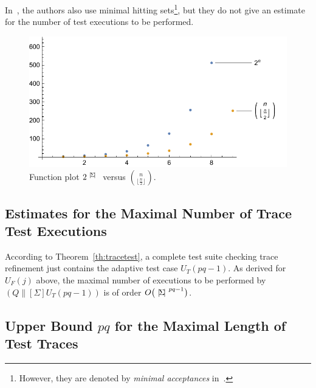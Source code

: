 In~\cite{DBLP:conf/icfem/CavalcantiG07}, the authors also use minimal hitting
sets\footnote{However, they are denoted by {\it minimal acceptances}
in~\cite{DBLP:conf/icfem/CavalcantiG07}.}, but they do not give an estimate for the number of test executions to be performed.


 \begin{figure}
 \begin{center}
\includegraphics[width=.8\textwidth]{curvecomparison.pdf}
\end{center}
\caption{Function plot $2^{{~|\! \Sigma\!|~}}$ versus $\binom{n}{\lfloor \frac{n}{2}\rfloor}$.}
 \label{fig:minhita}
 \end{figure}


\subsection{Estimates for the Maximal Number of Trace Test Executions}
\label{section:complexity:traces}

According to Theorem~\ref{th:tracetest}, a complete test suite checking trace
refinement just contains the adaptive test case $U_T(pq-1)$. As derived for
$U_F(j)$ above, the maximal number of executions to be performed by $(Q\parallel[\Sigma]
U_T(pq-1))$ is of order  $O\big({~|\! \Sigma\!|~}^{pq-1}\big)$.

\subsection{Upper Bound $pq$ for the Maximal Length of Test Traces}
\label{section:complexity:length}

